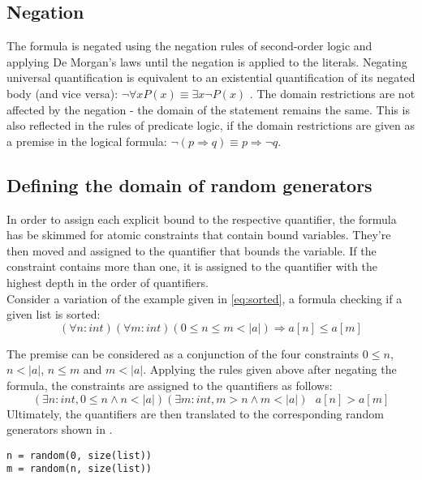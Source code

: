 \subsection{Negation}
The formula is negated using the negation rules of second-order logic and applying De Morgan's laws until the negation is applied to the literals. Negating universal quantification is equivalent to an existential quantification of its negated body (and vice versa): $\neg \forall x P(x) \equiv \exists x \neg P(x)$ \cite{Sundstrom2020Quantifiers}. The domain restrictions are not affected by the negation - the domain of the statement remains the same. This is also reflected in the rules of predicate logic, if the domain restrictions are given as a premise in the logical formula: $\neg (p \Rightarrow q) \equiv p \Rightarrow \neg q $.

\subsection{Defining the domain of random generators}
In order to assign each explicit bound to the respective quantifier, the formula has be skimmed for atomic constraints that contain bound variables. They're then moved and assigned to the quantifier that bounds the variable. If the constraint contains more than one, it is assigned to the quantifier with the highest depth in the order of quantifiers. \\
Consider a variation of the example given in \eqref{eq:sorted}, a formula checking if a given list is sorted:
\begin{equation}\label{eq:sorted_v2}
	(\forall n : int)(\forall m : int) (0 \leq n \le m < |a|) \Rightarrow a[n] \leq a[m]
\end{equation}

The premise can be considered as a conjunction of the four constraints $0 \leq n$, $n < |a| $, $n \le m$ and $m < |a|$. Applying the rules given above after negating the formula, the constraints are assigned to the quantifiers as follows:
\begin{equation}\label{eq:sorted_v2_bounds}
	(\exists n : int, 0 \leq n \wedge n < |a|)(\exists m : int, m > n \wedge m < |a|) \text{ } a[n] > a[m]
\end{equation}
Ultimately, the quantifiers are then translated to the corresponding random generators shown in .
\begin{lstlisting}[label=lst:rand]
n = random(0, size(list))
m = random(n, size(list))
\end{lstlisting}

